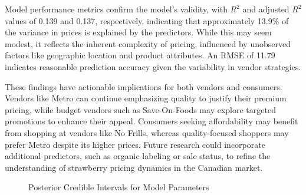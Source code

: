 \documentclass[
  letterpaper,
  DIV=11,
  numbers=noendperiod]{scrartcl}
\begin{document}
Model performance metrics confirm the model's validity, with \(R^2\) and
adjusted \(R^2\) values of 0.139 and 0.137, respectively, indicating
that approximately 13.9\% of the variance in prices is explained by the
predictors. While this may seem modest, it reflects the inherent
complexity of pricing, influenced by unobserved factors like geographic
location and product attributes. An RMSE of 11.79 indicates reasonable
prediction accuracy given the variability in vendor strategies.

These findings have actionable implications for both vendors and
consumers. Vendors like Metro can continue emphasizing quality to
justify their premium pricing, while budget vendors such as
Save-On-Foods may explore targeted promotions to enhance their appeal.
Consumers seeking affordability may benefit from shopping at vendors
like No Frills, whereas quality-focused shoppers may prefer Metro
despite its higher prices. Future research could incorporate additional
predictors, such as organic labeling or sale status, to refine the
understanding of strawberry pricing dynamics in the Canadian market.

\begin{figure}


\caption{\label{fig-CI}Posterior Credible Intervals for Model
Parameters}

\end{figure}%
\end{document}
